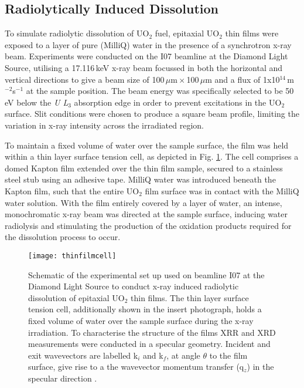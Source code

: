 \documentclass[twocolumn,prl,nobalancelastpage,aps,10pt]{revtex4-1}
\begin{document}
\subsection{Radiolytically Induced Dissolution}
To simulate radiolytic dissolution of UO$_2$ fuel, epitaxial UO$_2$ thin films were exposed to a layer of pure (MilliQ) water in the presence of a synchrotron x-ray beam. Experiments were conducted on the I07 beamline at the Diamond Light Source, utilising a 17.116\,keV x-ray beam focussed in both the horizontal and vertical directions to give a beam size of 100\,$\mu$m\,$\times$\,100\,$\mu$m and a flux of 1x10$^{14}$\,m$^{-2}$s$^{-1}$ at the sample position. The beam energy was specifically selected to be 50\,eV below the \textit{U L$_3$} absorption edge in order to prevent excitations in the UO$_2$ surface. Slit conditions were chosen to produce a square beam profile, limiting the variation in x-ray intensity across the irradiated region.

To maintain a fixed volume of water over the sample surface, the film was held within a thin layer surface tension cell, as depicted in Fig. \ref{fig:thinfilmcell}. The cell comprises a domed Kapton film extended over the thin film sample, secured to a stainless steel stub using an adhesive tape. MilliQ water was introduced beneath the Kapton film, such that the entire UO$_2$ film surface was in contact with the MilliQ water solution. With the film entirely covered by a layer of water, an intense, monochromatic x-ray beam was directed at the sample surface, inducing water radiolysis and stimulating the production of the oxidation products required for the dissolution process to occur.



\begin{figure}[h]
	\centering
	\texttt{[image: thinfilmcell]}
	\caption{Schematic of the experimental set up used on beamline I07 at the Diamond Light Source to conduct x-ray induced radiolytic dissolution of epitaxial UO$_2$ thin films. The thin layer surface tension cell, additionally shown in the insert photograph, holds a fixed volume of water over the sample surface during the x-ray irradiation. To characterise the structure of the films XRR and XRD measurements were conducted in a specular geometry. Incident and exit wavevectors are labelled k$_i$ and k$_f$, at angle $\theta$ to the film surface, give rise to a the wavevector momentum transfer (q$_z$) in the specular direction \cite{Springell2015}.}
	\label{fig:thinfilmcell}
\end{figure}
\end{document}
